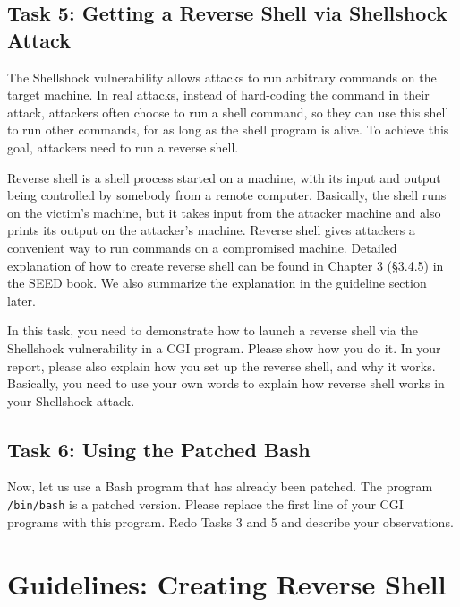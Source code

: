 \subsection{Task 5: Getting a Reverse Shell via Shellshock Attack}

The Shellshock vulnerability allows attacks to run arbitrary commands on
the target machine. In real attacks, instead of hard-coding the command 
in their attack, attackers often choose to run a shell
command, so they can use this shell to run other commands,
for as long as the shell program is alive. 
To achieve this goal, attackers need to run a reverse shell.

Reverse shell is a shell process started on a machine, with its input and output being
controlled by somebody from a remote computer. Basically, the shell runs
on the victim's machine, but it takes input from the attacker machine and
also prints its output on the attacker's machine. Reverse shell
gives attackers a convenient way to run commands on a compromised machine. 
Detailed explanation of how to create reverse shell can be found in Chapter
3 (\S 3.4.5) in the SEED book. We also summarize the explanation in
the guideline section later.


In this task, you need to demonstrate 
how to launch a reverse shell via the Shellshock vulnerability in a CGI program. 
Please show how you do it. In your report, please also explain 
how you set up the reverse shell, and why it works. Basically, you need to
use your own words to explain how reverse shell works in your Shellshock
attack. 


\subsection{Task 6: Using the Patched Bash}

Now, let us use a Bash program that has already been patched.
The program \texttt{/bin/bash} is a patched version.
Please replace the first line of 
your CGI programs with this program. 
Redo Tasks 3 and 5 and describe your observations. 


\section{Guidelines: Creating Reverse Shell}
\label{shellshock:sec:reverseshell}


